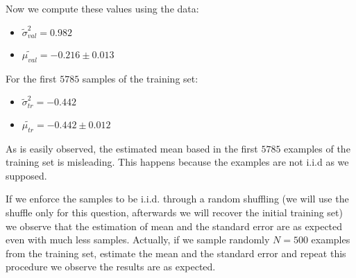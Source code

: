 \documentclass{article}
\begin{document}
Now we compute these values using the data:
\begin{itemize}
    \item $ \tilde{\sigma}_{val}^2 = 0.982 $
    \item $ \tilde{\mu_{val}} = - 0.216 \pm 0.013 $
\end{itemize}

For the first $5785$ samples of the training set:
\begin{itemize}
    \item $ \tilde{\sigma}_{tr}^2 = -0.442 $
    \item $ \tilde{\mu_{tr}} = - 0.442 \pm 0.012 $
\end{itemize}

As is easily observed, the estimated mean based in the first $5785$ examples of the training set is misleading. This happens because the examples are not i.i.d as we supposed.

If we enforce the samples to be i.i.d. through a random shuffling (we will use the shuffle only for this question, afterwards we will recover the initial training set) we observe that the estimation of mean and the standard error are as expected even with much less samples. Actually, if we sample randomly $N=500$ examples from the training set, estimate the mean and the standard error and repeat this procedure we observe the results are as expected.
\end{document}

